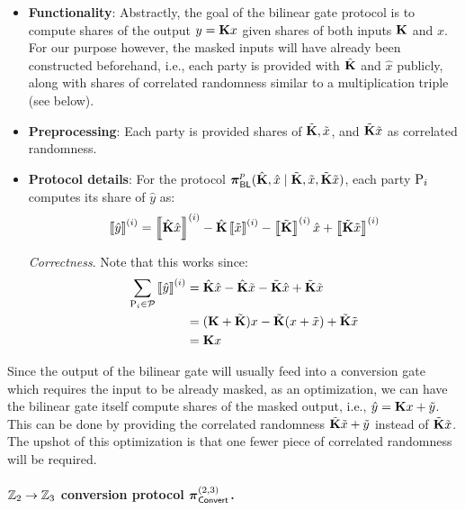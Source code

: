 \begin{itemize}
  \item \textbf{Functionality}: 
  Abstractly, the goal of the bilinear gate protocol is to compute shares of the output $y = \mat{K}x$ given shares of both inputs $\mat{K}$ and $x$. For our purpose however, the masked inputs will have already been constructed beforehand, i.e., each party is provided with $\hat{\mat{K}}$ and $\hat{x}$ publicly, along with shares of correlated randomness similar to a multiplication triple (see below).

  \item \textbf{Preprocessing}: Each party is provided shares of $\tilde{\mat{K}}, \tilde{x}$, and $\tilde{\mat{K}}\tilde{x}$ as correlated randomness.

  \item \textbf{Protocol details}: For the protocol $\prot_\BLMap^p(\hat{\mat{K}},\hat{x}\mid \tilde{\mat{K}}, \tilde{x}, \tilde{\mat{K}}\tilde{x})$, each party $\textnormal{P}_i$ computes its share of $\hat{y}$ as:
  \[
    \sharei{\hat{y}} = \sharei{\hat{\mat{K}}\hat{x}} - \hat{\mat{K}}\sharei{\tilde{x}} - \sharei{\tilde{\mat{K}}}\hat{x} + \sharei{\tilde{\mat{K}}\tilde{x}}
  \]

  \noindent \textit{Correctness}. Note that this works since:
  \begin{align*}
  \sum_{\party_i \in \parties} \sharei{\hat{y}} &= \hat{\mat{K}}\hat{x} - \hat{\mat{K}}\tilde{x} - \tilde{\mat{K}}\hat{x} + \tilde{\mat{K}}\tilde{x} \\
  &= (\mat{K} + \tilde{\mat{K}})x - \tilde{\mat{K}}(x + \tilde{x}) + \tilde{\mat{K}}\tilde{x} \\
  &= \mat{K}x
  \end{align*}
\end{itemize}
Since the output of the bilinear gate will usually feed into a conversion gate which requires the input to be already masked, as an optimization, we can have the bilinear gate itself compute shares of the masked output, i.e., $\hat{y} = \mat{K}x + \tilde{y}$. This can be done by providing the correlated randomness $\tilde{\mat{K}}\tilde{x} + \tilde{y}$ instead of $\tilde{\mat{K}}\tilde{x}$. The upshot of this optimization is that one fewer piece of correlated randomness will be required.
\fi
\paragraph{$\mathbb{Z}_2 \to \mathbb{Z}_3$ conversion protocol $\boldsymbol{\pi}_{\textnormal{\textsf{Convert}}}^{(2,3)}$.}

